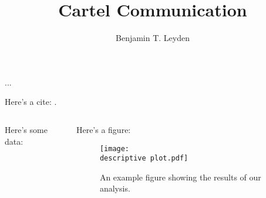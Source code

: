 \documentclass[11pt, aspectratio=169, handout]{beamer}
\title[]{Cartel Communication}
\author[Leyden]{Benjamin T. Leyden}
\institute{
	SC Johnson College of Business\\
	Cornell University\\

	\begin{tabular}{@{}ll}
	twitter: & {\href{https://www.twitter.com/btleyden}{@btleyden}}\\
	email: & {\href{mailto:leyden@cornell.edu}{leyden@cornell.edu}}\\
	\end{tabular}
}
\def\descriptive{../../input/descriptive/}
\begin{document}
\maketitle


\begin{frame}{...}

Here's a cite: \citet{Anderson1992}.

\begin{columns}
	\begin{column}{0.5\textwidth}
		Here's some data:
		
	\end{column}
	\begin{column}{0.5\textwidth}
		Here's a figure:
		\begin{figure}[htbp]
			\centering
			\texttt{[image: \\descriptive plot.pdf]}
			\caption{An example figure showing the results of our analysis.}
			\label{fig:example_figure}
		\end{figure}
	\end{column}
	\end{columns}

\end{frame}



\end{document}
